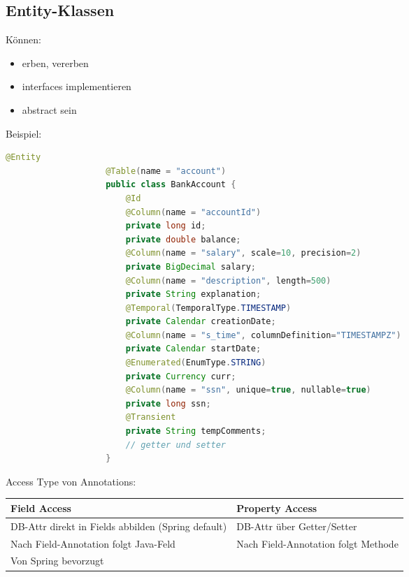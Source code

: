 \documentclass[a4paper, landscape, 8pt]{scrartcl}
\begin{document}
\begin{multicols*}{4}
        \subsection{Entity-Klassen}
        Können:
        \begin{itemize}
            \item erben, vererben
            \item interfaces implementieren
            \item abstract sein
        \end{itemize}
        Beispiel:
        \begin{lstlisting}[language=java]
                    @Entity
                    @Table(name = "account")
                    public class BankAccount {
                        @Id
                        @Column(name = "accountId")
                        private long id;
                        private double balance;
                        @Column(name = "salary", scale=10, precision=2)
                        private BigDecimal salary;
                        @Column(name = "description", length=500)
                        private String explanation;
                        @Temporal(TemporalType.TIMESTAMP)
                        private Calendar creationDate;
                        @Column(name = "s_time", columnDefinition="TIMESTAMPZ")
                        private Calendar startDate;
                        @Enumerated(EnumType.STRING)
                        private Currency curr;
                        @Column(name = "ssn", unique=true, nullable=true)
                        private long ssn;
                        @Transient
                        private String tempComments;
                        // getter und setter
                    }
        \end{lstlisting}

        Access Type von Annotations: \\
        \begin{tabularx}{\columnwidth}{X | X}
            Field Access & Property Access \\
            \hline
            DB-Attr direkt in Fields abbilden (Spring default) & DB-Attr über Getter/Setter \\
            \hline
            Nach Field-Annotation folgt Java-Feld & Nach Field-Annotation folgt Methode \\
            \hline
            Von Spring bevorzugt &
        \end{tabularx}


\end{multicols*}
\end{document}

